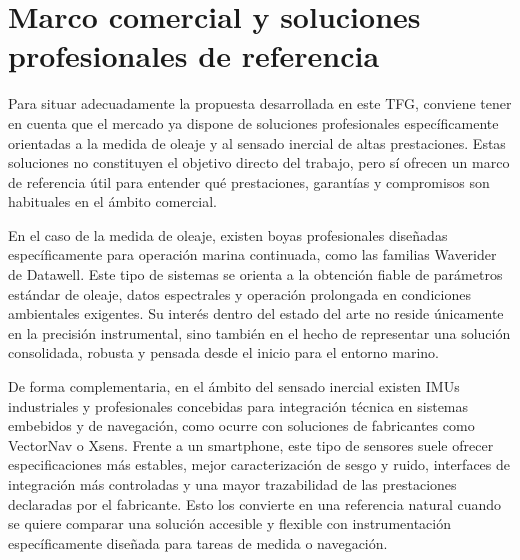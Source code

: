 



\section{Marco comercial y soluciones profesionales de referencia}

Para situar adecuadamente la propuesta desarrollada en este TFG, conviene tener en cuenta que el mercado ya dispone de soluciones profesionales específicamente orientadas a la medida de oleaje y al sensado inercial de altas prestaciones. Estas soluciones no constituyen el objetivo directo del trabajo, pero sí ofrecen un marco de referencia útil para entender qué prestaciones, garantías y compromisos son habituales en el ámbito comercial.

En el caso de la medida de oleaje, existen boyas profesionales diseñadas específicamente para operación marina continuada, como las familias Waverider de Datawell. Este tipo de sistemas se orienta a la obtención fiable de parámetros estándar de oleaje, datos espectrales y operación prolongada en condiciones ambientales exigentes. Su interés dentro del estado del arte no reside únicamente en la precisión instrumental, sino también en el hecho de representar una solución consolidada, robusta y pensada desde el inicio para el entorno marino.

De forma complementaria, en el ámbito del sensado inercial existen IMUs industriales y profesionales concebidas para integración técnica en sistemas embebidos y de navegación, como ocurre con soluciones de fabricantes como VectorNav o Xsens. Frente a un smartphone, este tipo de sensores suele ofrecer especificaciones más estables, mejor caracterización de sesgo y ruido, interfaces de integración más controladas y una mayor trazabilidad de las prestaciones declaradas por el fabricante. Esto los convierte en una referencia natural cuando se quiere comparar una solución accesible y flexible con instrumentación específicamente diseñada para tareas de medida o navegación.

